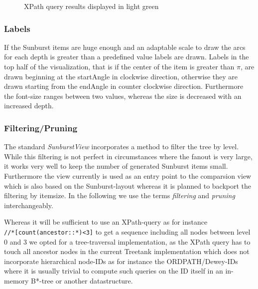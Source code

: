 \begin{itemize}
\begin{figure}[tb]
\caption{\label{fig:sunburstxpath} XPath query results displayed in light green}
\end{figure}

\subsubsection{Labels}
If the Sunburst items are huge enough and an adaptable scale to draw the arcs for each depth is greater than a predefined value labels are drawn. Labels in the top half of the visualization, that is if the center of the item is greater than $\pi$, are drawn beginning at the startAngle in clockwise direction, otherwise they are drawn starting from the endAngle in counter clockwise direction. Furthermore the font-size ranges between two values, whereas the size is decreased with an increased depth. 

\subsubsection{Filtering/Pruning}
The standard \emph{SunburstView} incorporates a method to filter the tree by level. While this filtering is not perfect in circumstances where the fanout is very large, it works very well to keep the number of generated Sunburst items small. Furthermore the view currently is used as an entry point to the comparsion view which is also based on the Sunburst-layout whereas it is planned to backport the filtering by itemsize. In the following we use the terms \emph{filtering} and \emph{pruning} interchangeably.

Whereas it will be sufficient to use an XPath-query as for instance \\
\texttt{//*[count(ancestor::*)<3]} to get a sequence including all nodes between level 0 and 3 we opted for a tree-traversal implementation, as the XPath query has to touch all ancestor nodes in the current Treetank implementation which does not incorporate hierarchical node-IDs as for instance the ORDPATH/Dewey-IDs where it is usually trivial to compute such queries on the ID itself in an in-memory B*-tree or another datastructure.
\end{itemize}

